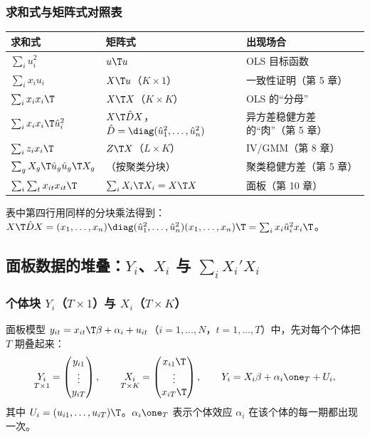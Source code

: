 \subsubsection{求和式与矩阵式对照表}

\begin{center}
\small
\begin{tabularx}{\linewidth}{llL}
\toprule
求和式 & 矩阵式 & 出现场合\\
\midrule
$\sum_i u_i^2$ & $u\T u$ & OLS 目标函数\\
$\sum_i x_iu_i$ & $X\T u$（$K\times1$） & 一致性证明（第 5 章）\\
$\sum_i x_ix_i\T$ & $X\T X$（$K\times K$） & OLS 的“分母”\\
$\sum_i x_ix_i\T\hat u_i^2$ & $X\T\hat DX$，$\hat D=\diag(\hat u_1^2,\dots,\hat u_n^2)$ & 异方差稳健方差的“肉”（第 5 章）\\
$\sum_i z_ix_i\T$ & $Z\T X$（$L\times K$） & IV/GMM（第 8 章）\\
$\sum_g X_g\T\hat u_g\hat u_g\T X_g$ & （按聚类分块） & 聚类稳健方差（第 5 章）\\
$\sum_i\sum_t x_{it}x_{it}\T$ & $\sum_i X_i\T X_i=X\T X$ & 面板（第 10 章）\\
\bottomrule
\end{tabularx}
\end{center}
表中第四行用同样的分块乘法得到：$X\T\hat DX=(x_1,\dots,x_n)\diag(\hat u_1^2,\dots,\hat u_n^2)(x_1,\dots,x_n)\T=\sum_i x_i\hat u_i^2x_i\T$。

\subsection{面板数据的堆叠：\texorpdfstring{$Y_i$、$X_i$ 与 $\sum_i X_i'X_i$}{Y\_i, X\_i and sum X\_i'X\_i}}

\subsubsection{个体块 \texorpdfstring{$Y_i$（$T\times1$）与 $X_i$（$T\times K$）}{Y\_i (T x 1) and X\_i (T x K)}}

面板模型 $y_{it}=x_{it}\T\beta+\alpha_i+u_{it}$（$i=1,\dots,N$，$t=1,\dots,T$）中，先对每个个体把 $T$ 期叠起来：
\[
\underset{T\times1}{Y_i}=\begin{pmatrix}y_{i1}\\\vdots\\y_{iT}\end{pmatrix},\qquad
\underset{T\times K}{X_i}=\begin{pmatrix}x_{i1}\T\\\vdots\\x_{iT}\T\end{pmatrix},\qquad
Y_i=X_i\beta+\alpha_i\one_T+U_i,
\]
其中 $U_i=(u_{i1},\dots,u_{iT})\T$。$\alpha_i\one_T$ 表示个体效应 $\alpha_i$ 在该个体的每一期都出现一次。

